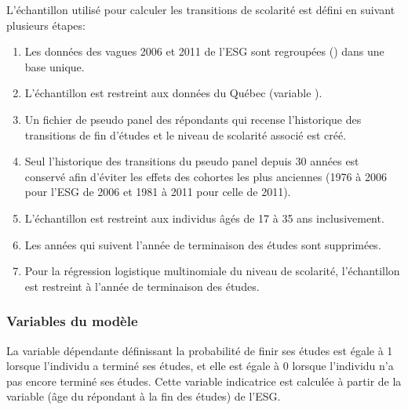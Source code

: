 \documentclass[letterpaper,10pt,french]{sphinxmanual}
\begin{document}
L’échantillon utilisé pour calculer les transitions de scolarité est défini en suivant plusieurs étapes:
\begin{enumerate}
%
\item {} 
Les données des vagues 2006 et 2011 de l’ESG sont regroupées () dans une base unique.

\item {} 
L’échantillon est restreint aux données du Québec (variable ).

\item {} 
Un fichier de pseudo panel des répondants qui recense l’historique des transitions de fin d’études et le niveau de scolarité associé est créé.

\item {} 
Seul l’historique des transitions du pseudo panel depuis 30 années est conservé afin d’éviter les effets des cohortes les plus anciennes (1976 à 2006 pour l’ESG de 2006 et 1981 à 2011 pour celle de 2011).

\item {} 
L’échantillon est restreint aux individus âgés de 17 à 35 ans inclusivement.

\item {} 
Les années qui suivent l’année de terminaison des études sont supprimées.

\item {} 
Pour la régression logistique multinomiale du niveau de scolarité, l’échantillon est restreint à l’année de terminaison des études.

\end{enumerate}


\subsubsection{Variables du modèle}
\label{\detokenize{methodologie:id4}}
La variable dépendante  définissant la probabilité de finir ses études est égale à 1 lorsque l’individu a terminé ses études, et elle est égale à 0 lorsque l’individu n’a pas encore terminé ses études. Cette variable indicatrice est calculée à partir de la variable  (âge du répondant à la fin des études) de l’ESG.
\end{document}
